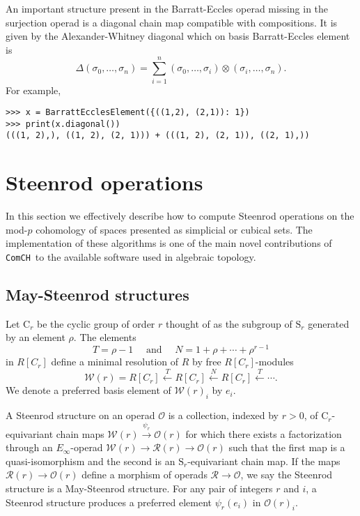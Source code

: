 \documentclass{amsart}
\renewcommand{\S}{\mathrm S}
\newcommand{\comch}{\texttt{ComCH}}
\begin{document}
An important structure present in the Barratt-Eccles operad missing in the surjection operad is a diagonal chain map compatible with compositions. It is given by the Alexander-Whitney diagonal which on basis Barratt-Eccles element is
\begin{equation*}
\Delta(\sigma_0, \dots, \sigma_n) = \sum_{i=1}^n (\sigma_0, \dots, \sigma_i) \otimes (\sigma_i, \dots, \sigma_n).
\end{equation*}
For example,
\begin{Verbatim}[frame=single, samepage=true]
>>> x = BarrattEcclesElement({((1,2), (2,1)): 1})
>>> print(x.diagonal())
(((1, 2),), ((1, 2), (2, 1))) + (((1, 2), (2, 1)), ((2, 1),))
\end{Verbatim}

\section{Steenrod operations} \label{s: steenrod operations}

In this section we effectively describe how to compute Steenrod operations on the mod-$p$ cohomology of spaces presented as simplicial or cubical sets. The implementation of these algorithms is one of the main novel contributions of \comch\, to the available software used in algebraic topology.

\subsection{May-Steenrod structures}

Let $\mathrm{C}_r$ be the cyclic group of order $r$ thought of as the subgroup of $\mathrm{S}_r$ generated by an element $\rho$. The elements
\begin{equation*}
T = \rho-1 \quad \text{ and } \quad N = 1+\rho+\cdots+\rho^{r-1}
\end{equation*}
in $R[C_r]$ define a minimal resolution of $R$ by free $R[C_r]$-modules
\begin{equation*}
\mathcal W(r) = R[C_r] \stackrel{T}{\longleftarrow} R[C_r] \stackrel{N}{\longleftarrow} R[C_r] \stackrel{T}{\longleftarrow} \cdots.
\end{equation*}
We denote a preferred basis element of $\mathcal W(r)_i$ by $e_i$.

A Steenrod structure on an operad $\mathcal O$ is a collection, indexed by $r > 0$, of $\mathrm C_r$-equivariant chain maps $\mathcal W(r) \stackrel{\psi_r}{\longrightarrow} \mathcal O(r)$ for which there exists a factorization through an $E_\infty$-operad $\mathcal W(r) \to \mathcal R(r) \to \mathcal O(r)$ such that the first map is a quasi-isomorphism and the second is an $\S_r$-equivariant chain map. If the maps $\mathcal R(r) \to \mathcal O(r)$ define a morphism of operads $\mathcal R \to \mathcal O$, we say the Steenrod structure is a May-Steenrod structure.
For any pair of integers $r$ and $i$, a Steenrod structure produces a preferred element $\psi_r(e_i)$ in $\mathcal O(r)_i$.
\end{document}
